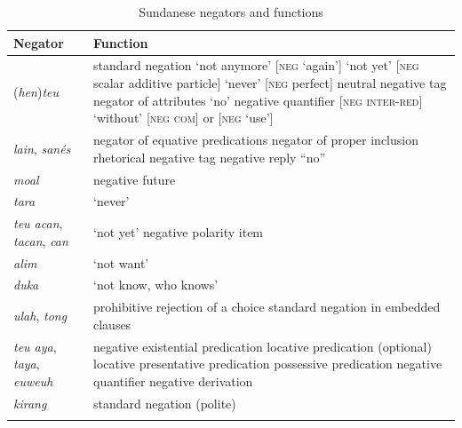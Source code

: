 \documentclass[output=paper]{langscibook}
\begin{document}
\begin{table}%
\caption{Sundanese negators and functions}
\label{tab:sun:2}
\begin{tabularx}{\textwidth}{lX}
\lsptoprule
{Negator}  & {Function} \\
\midrule
{(\textit{hen})\textit{teu}} & {standard negation}\newline
    {‘not anymore’ [\textsc{neg} ‘again’]}\newline     
    {‘not yet’ [\textsc{neg} scalar additive particle]}\newline
    {‘never’ [\textsc{neg} perfect]}\newline
    {neutral negative tag}\newline
    {negator of attributes}\newline
    {‘no’}\newline
    {negative quantifier [\textsc{neg} \textsc{inter}-\textsc{red}]}\newline
    {‘without’ [\textsc{neg} \textsc{com}] or [\textsc{neg} ‘use’]}\\
{\textit{lain}, \textit{sanés}} & {negator of equative predications}\newline
    {negator of proper inclusion}\newline
    {rhetorical negative tag}\newline
    {negative reply “no”} \\
{\textit{moal}}  & {negative future}\\
{\textit{tara}}  & {‘never’}\\
{\textit{teu acan}, \textit{tacan}, \textit{can}} & {‘not yet’}\newline
    {negative polarity item} \\
{\textit{alim}} & {‘not want’}\\
{\textit{duka}}  & {‘not know, who knows’}\\
{\textit{ulah}, \textit{tong}} & {prohibitive} \newline
    {rejection of a choice} \newline
    {standard negation in embedded clauses}\\
{\textit{teu aya}, \textit{taya}, \textit{euweuh}}  & {negative existential predication}\newline
    {locative predication (optional)}\newline
    {locative presentative predication}\newline
    {possessive predication} \newline
    {negative quantifier} \newline
    {negative derivation} \\
{\textit{kirang}}  & {standard negation (polite)}\\
\lspbottomrule
\end{tabularx}
\end{table}
\end{document}
